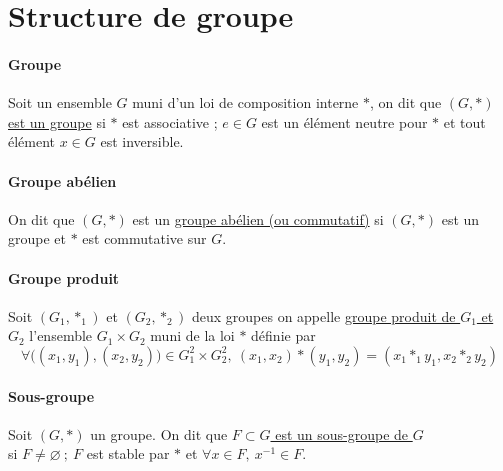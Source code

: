 	\section{Structure de groupe}
		\traitd 
		\paragraph{Groupe}
			Soit un ensemble $G$ muni d'un loi de composition interne $*$, on dit que \underline{$(G,*)$ est un groupe} si
			$*$ est associative ; $e \in G$ est un élément neutre pour $*$ et tout élément $x\in G$ est inversible.\trait ${}$ \vspace*{-1.2cm} \traitd
		\paragraph{Groupe abélien}
			On dit que $(G,*)$ est un \underline{groupe abélien (ou commutatif)} si $(G,*)$ est un groupe et $*$ est commutative sur $G$. \trait
		${}$ \vspace*{-1.4cm} \traitd
		\paragraph{Groupe produit}
			Soit $(G_1,*_1)$ et $(G_2,*_2)$ deux groupes on appelle \underline{groupe produit de $G_1$ et $G_2$} l'ensemble $G_1\times G_2$ muni 
			de la loi $*$ définie par \[\forall \big( (x_1,y_1),(x_2,y_2)\big) \in G_1^2\times G_2^2 ,~(x_1,x_2)*(y_1,y_2) = 
			(x_1*_1y_1 , x_2*_2y_2)\] \vspace*{-0.7cm} \trait
		 \traitd
		\paragraph{Sous-groupe}
			Soit $(G,*)$ un groupe. On dit que \underline{$F\subset G$ est un sous-groupe de $G$} \\ si $F\neq \varnothing ~;~F$ est stable par $*$ 
			et $\forall x\in F ,~x^{-1} \in F$. \trait
		\vspace*{0.5cm} \\  \newpage\traitd
